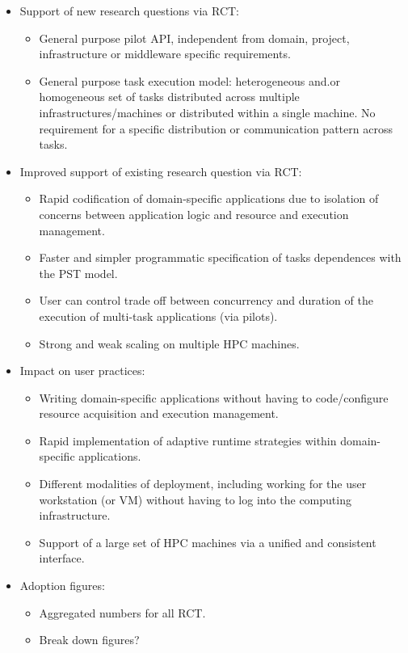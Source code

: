 \documentclass[preprint,12pt, a4paper]{elsarticle}
\begin{document}
\begin{itemize}
  \item Support of new research questions via RCT\@:
  \begin{itemize}
    \item General purpose pilot API, independent from domain, project,
    infrastructure or middleware specific requirements.
    \item General purpose task execution model: heterogeneous and.or
    homogeneous set of tasks distributed across multiple
    infrastructures/machines or distributed within a single machine. No
    requirement for a specific distribution or communication pattern across
    tasks.
  \end{itemize}
  \item Improved support of existing research question via RCT\@:
  \begin{itemize}
    \item Rapid codification of domain-specific applications due to isolation
    of concerns between application logic and resource and execution
    management.
    \item Faster and simpler programmatic specification of tasks dependences
    with the PST model.
    \item User can control trade off between concurrency and duration of the
    execution of multi-task applications (via pilots).
    \item Strong and weak scaling on multiple HPC machines.
  \end{itemize}
  \item Impact on user practices:
  \begin{itemize}
    \item Writing domain-specific applications without having to
    code/configure resource acquisition and execution management.
    \item Rapid implementation of adaptive runtime strategies within
    domain-specific applications.
    \item Different modalities of deployment, including working for the user
    workstation (or VM) without having to log into the computing
    infrastructure.
    \item Support of a large set of HPC machines via a unified and consistent
    interface.
  \end{itemize}
  \item Adoption figures:
  \begin{itemize}
    \item Aggregated numbers for all RCT.
    \item Break down figures?
  \end{itemize}
\end{itemize}
\end{document}
